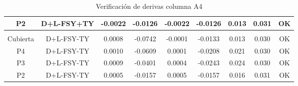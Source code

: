 \begin{table}[H]
{\begin{tabular}{|c|c|c|c|c|c|c|c|c|}
    \hline
    P2  & D+L-FSY+TY & -0.0022 & -0.0126 & -0.0022 & -0.0126 & 0.013 & 0.031 & \cellcolor[rgb]{ .776,  .937,  .808}\textcolor[rgb]{ 0,  .38,  0}{OK} \bigstrut\\
    \hline
    \multicolumn{1}{|r}{} & \multicolumn{1}{r}{} & \multicolumn{1}{r}{} & \multicolumn{1}{r}{} & \multicolumn{1}{r}{} & \multicolumn{1}{r}{} & \multicolumn{1}{r}{} & \multicolumn{1}{r}{} &  \bigstrut\\
    \hline
    Cubierta & D+L-FSY-TY & 0.0008 & -0.0742 & -0.0001 & -0.0133 & 0.013 & 0.030 & \cellcolor[rgb]{ .776,  .937,  .808}\textcolor[rgb]{ 0,  .38,  0}{OK} \bigstrut\\
    \hline
    P4  & D+L-FSY-TY & 0.0010 & -0.0609 & 0.0001 & -0.0208 & 0.021 & 0.030 & \cellcolor[rgb]{ .776,  .937,  .808}\textcolor[rgb]{ 0,  .38,  0}{OK} \bigstrut\\
    \hline
    P3  & D+L-FSY-TY & 0.0009 & -0.0401 & 0.0004 & -0.0243 & 0.024 & 0.030 & \cellcolor[rgb]{ .776,  .937,  .808}\textcolor[rgb]{ 0,  .38,  0}{OK} \bigstrut\\
    \hline
    P2  & D+L-FSY-TY & 0.0005 & -0.0157 & 0.0005 & -0.0157 & 0.016 & 0.031 & \cellcolor[rgb]{ .776,  .937,  .808}\textcolor[rgb]{ 0,  .38,  0}{OK} \bigstrut\\
    \hline
    \end{tabular}}%
  \caption{Verificación de derivas columna A4}
  \label{tab:VDA4}%
\end{table}%
